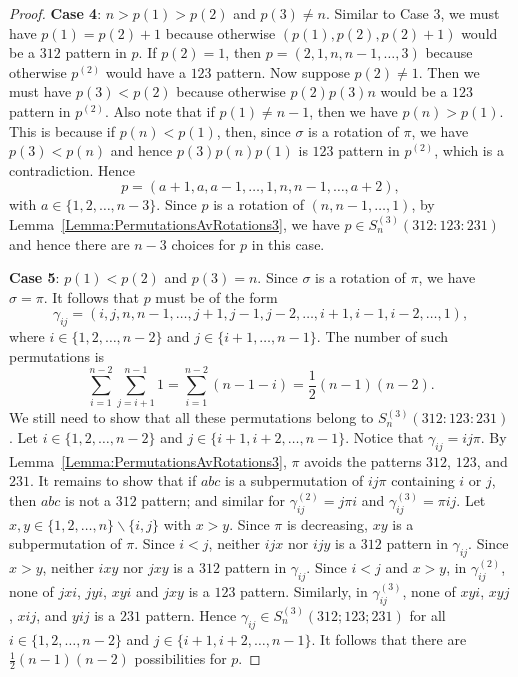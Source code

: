 \documentclass[11pt]{article}
\theoremstyle{definition}
\newcommand{\half}{{\textstyle\frac12}}
\numberwithin{equation}{section}
\begin{document}
\begin{proof}
    {\bf Case 4}: $n>p(1)>p(2)$ and $p(3)\neq n$. Similar to Case 3, we must have $p(1)=p(2)+1$ because otherwise $(p(1),p(2),p(2)+1)$ would be a $312$ pattern in $p$. If $p(2)=1$, then $p=(2,1,n,n-1,\ldots,3)$ because otherwise $p^{(2)}$ would have a $123$ pattern. Now suppose $p(2)\neq 1$. Then we must have $p(3)<p(2)$ because otherwise $p(2)p(3)n$ would be a $123$ pattern in $p^{(2)}$. Also note that if $p(1)\neq n-1$, then we have $p(n)>p(1)$. This is because if $p(n)<p(1)$, then, since $\sigma$ is a rotation of $\pi$, we have $p(3)<p(n)$ and hence $p(3)p(n)p(1)$ is $123$ pattern in $p^{(2)}$, which is a contradiction. 
Hence
    \[
    p=(a+1,a,a-1,\ldots,1,n,n-1,\ldots,a+2),
    \]
    with $a\in\{1,2,\ldots,n-3\}$. Since $p$ is a rotation of $(n,n-1,\ldots,1)$, by Lemma~\ref{Lemma:PermutationsAvRotations3}, we have $p\in S_n^{(3)}(312:123:231)$ and hence there are $n-3$ choices for $p$ in this case.

    {\bf Case 5}: $p(1)<p(2)$ and $p(3)=n$. Since $\sigma$ is a rotation of $\pi$, we have $\sigma=\pi$. It follows that $p$ must be of the form
    \[
    \gamma_{ij}=(i,j,n,n-1,\ldots,j+1,j-1,j-2,\ldots,i+1,i-1,i-2,\ldots,1),
    \]
    where $i\in\{1,2,\ldots,n-2\}$ and $j\in\{i+1,\ldots,n-1\}$.
    The number of such permutations is
    \[
    \sum_{i=1}^{n-2}\sum_{j=i+1}^{n-1}1=\sum_{i=1}^{n-2}(n-1-i)=\half (n-1)(n-2).
    \]
    We still need to show that all these permutations belong to $S_n^{(3)}(312:123:231)$. Let $i\in\{1,2,\ldots,n-2\}$ and $j\in\{i+1,i+2,\ldots,n-1\}$. Notice that $\gamma_{ij}=ij\pi$. By Lemma~\ref{Lemma:PermutationsAvRotations3}, $\pi$ avoids the patterns $312$, $123$, and $231$. It remains to show that if $abc$ is a subpermutation of $ij\pi$ containing $i$ or $j$, then $abc$ is not a $312$ pattern; and similar for $\gamma_{ij}^{(2)}=j\pi i$ and $\gamma_{ij}^{(3)}=\pi ij$. Let $x,y\in\{1,2,\ldots,n\}\backslash\{i,j\}$ with $x>y$. Since $\pi$ is decreasing, $xy$ is a subpermutation of $\pi$. Since $i<j$, neither $ijx$ nor $ijy$ is a $312$ pattern in $\gamma_{ij}$. Since $x>y$, neither $ixy$ nor $jxy$ is a $312$ pattern in $\gamma_{ij}$. Since $i<j$ and $x>y$, in $\gamma_{ij}^{(2)}$, none of $jxi$, $jyi$, $xyi$ and $jxy$ is a $123$ pattern. Similarly, in $\gamma_{ij}^{(3)}$, none of $xyi$, $xyj$, $xij$, and $yij$ is a $231$ pattern. Hence $\gamma_{ij}\in S_n^{(3)}(312;123;231)$ for all $i\in\{1,2,\ldots,n-2\}$ and $j\in\{i+1,i+2,\ldots,n-1\}$. 
It follows that there are $\half (n-1)(n-2)$ possibilities for $p$.
    

\end{proof}
\end{document}
